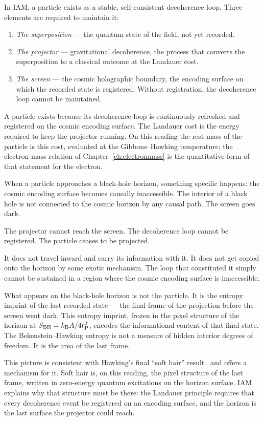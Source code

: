 In IAM, a particle exists as a stable, self-consistent decoherence loop. Three elements are required to maintain it:
\begin{enumerate}
\item \emph{The superposition} --- the quantum state of the field, not yet recorded.
\item \emph{The projector} --- gravitational decoherence, the process that converts the superposition to a classical outcome at the Landauer cost.
\item \emph{The screen} --- the cosmic holographic boundary, the encoding surface on which the recorded state is registered. Without registration, the
decoherence loop cannot be maintained.
\end{enumerate}
A particle exists because its decoherence loop is continuously refreshed and registered on the cosmic encoding surface. The Landauer cost is the energy
required to keep the projector running. On this reading the rest mass of the particle is this cost, evaluated at the Gibbons--Hawking temperature; the
electron-mass relation of Chapter~\ref{ch:electronmass} is the quantitative form of that statement for the electron. \conjecture

When a particle approaches a black-hole horizon, something specific happens: the cosmic encoding surface becomes causally inaccessible. The interior of a
black hole is not connected to the cosmic horizon by any causal path. The screen goes dark.

The projector cannot reach the screen. The decoherence loop cannot be registered. The particle ceases to be projected.

It does not travel inward and carry its information with it. It does not get copied onto the horizon by some exotic mechanism. The loop that constituted
it simply cannot be sustained in a region where the cosmic encoding surface is inaccessible.

What appears on the black-hole horizon is not the particle. It is the entropy imprint of the last recorded state --- the final frame of the projection before
the screen went dark. This entropy imprint, frozen in the pixel structure of the horizon at $S_{\rm BH}=k_{\mathrm B} A/4\ell_{\mathrm P}^2$, encodes the informational content of that
final state. The Bekenstein--Hawking entropy is not a measure of hidden interior degrees of freedom. It is the area of the last frame. \conjecture

This picture is consistent with Hawking's final ``soft hair'' result~\cite{HawkingPerryStrominger2016} and offers a mechanism for it. Soft hair is, on this reading, the pixel
structure of the last frame, written in zero-energy quantum excitations on the horizon surface. IAM explains why that structure must be there: the Landauer
principle requires that every decoherence event be registered on an encoding surface, and the horizon is the last surface the projector could reach.
\conjecture

